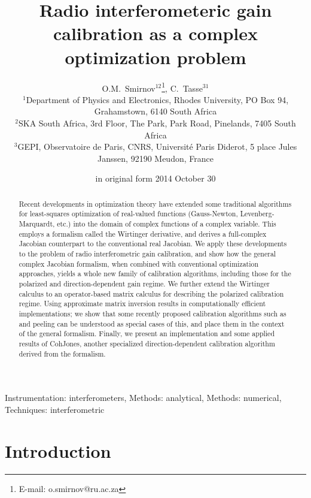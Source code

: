 \documentclass[useAMS,usenatbib]{mn2e}
\title[Radio interferometeric gain calibration as a complex optimization problem]{Radio interferometeric gain calibration as a complex optimization problem}
\author[O.M.~Smirnov \& C.~Tasse]{O.M.~Smirnov$^{12}$\thanks{E-mail: o.smirnov@ru.ac.za}, C.~Tasse$^{31}$\\
$^1$Department of Physics and Electronics, Rhodes University, PO Box 94, Grahamstown, 6140 South Africa\\
$^2$SKA South Africa, 3rd Floor, The Park, Park Road, Pinelands, 7405 South Africa\\
$^3$GEPI, Observatoire de Paris, CNRS, Universit\'e Paris Diderot,
5 place Jules Janssen, 92190 Meudon, France}
\newcommand{\StefCal}{{\sc StefCal}}
\begin{document}
\date{in original form 2014 October 30}

\pagerange{\pageref{firstpage}--\pageref{lastpage}} 

\maketitle

\label{firstpage}

\begin{abstract}
Recent developments in optimization theory have extended some traditional algorithms for least-squares optimization of 
real-valued functions (Gauss-Newton, Levenberg-Marquardt, etc.) into the domain of complex functions of a complex 
variable. This employs a formalism called the Wirtinger derivative, and derives a full-complex Jacobian counterpart 
to the conventional real Jacobian. We apply these developments to the problem of radio interferometric gain 
calibration, and show how the general complex Jacobian formalism, when combined with conventional optimization 
approaches, yields a whole new family of calibration algorithms, including those for the polarized and 
direction-dependent gain regime. We further extend the Wirtinger calculus to an operator-based matrix calculus 
for describing the polarized calibration regime. Using approximate matrix 
inversion results in computationally efficient implementations; we show that some recently proposed calibration algorithms 
such as {\sc \StefCal} and peeling can be understood as special cases of this, and place them in the context of the general 
formalism. Finally, we present an implementation and some applied results of {\sc CohJones}, another specialized 
direction-dependent calibration algorithm derived from the formalism.

\end{abstract}

\begin{keywords}
Instrumentation: interferometers, Methods: analytical, Methods: numerical, Techniques: interferometric
\end{keywords}

\section*{Introduction}
\end{document}
